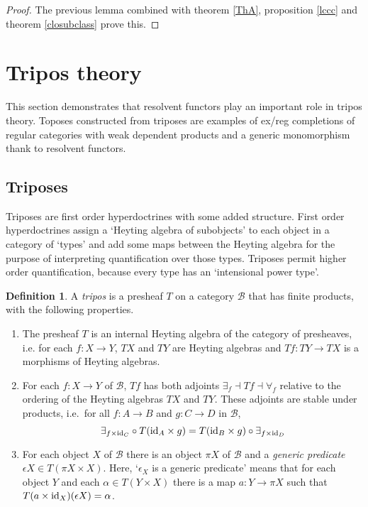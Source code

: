\documentclass[sort&compress]{elsarticle}
\theoremstyle{plain}
\theoremstyle{definition}
\newtheorem{defin}[theorem]{Definition}
\theoremstyle{remark}
\newcommand\hide[1]{}
\newcommand\cat\mathcal
\newcommand\exreg{_\mathrm{ex/reg}}
\begin{document}
\begin{proof} The previous lemma combined with theorem \ref{ThA}, proposition \ref{lccc} and theorem \ref{closubclass} prove this. \end{proof}

\hide{Menni's vraag over $\cat L$ is hiermee ook beantwoord: als $\cat L$ een topos is, dan is hij $\cat C\exreg$, en daar volgt verder alles uit. }

\section{Tripos theory}
This section demonstrates that resolvent functors play an important role in tripos theory. Toposes constructed from triposes are examples of ex/reg completions of regular categories with weak dependent products and a generic monomorphism thank to resolvent functors.

\subsection{Triposes}\label{TriThe}
Triposes are first order hyperdoctrines with some added structure. First order hyperdoctrines assign a `Heyting algebra of subobjects' to each object in a category of `types' and add some maps between the Heyting algebra for the purpose of interpreting quantification over those types. Triposes permit higher order quantification, because every type has an `intensional power type'.

\begin{defin} A \emph{tripos} is a presheaf $T$ on a category $\cat B$ that has finite products, with the following properties.
\begin{enumerate}
\item The presheaf $T$ is an internal Heyting algebra of the category of presheaves, i.e. for each $f:X\to Y$, $TX$ and $TY$ are Heyting algebras and $Tf:TY\to TX$ is a morphisms of Heyting algebras.
\item For each $f:X\to Y$ of $\cat B$, $Tf$ has both adjoints $\exists_f\dashv Tf \dashv \forall_f$ relative to the ordering of the Heyting algebras $TX$ and $TY$. 
These adjoints are stable under products, i.e.\ for all $f:A\to B$ and $g:C\to D$ in $\cat B$, 
\[ \exists_{f\times \mathrm{id}_C}\circ T(\mathrm{id}_A\times g) = T(\mathrm{id}_B\times g)\circ \exists_{f\times \mathrm{id}_D} \]
\item For each object $X$ of $\cat B$ there is an object $\pi X$ of $\cat B$ and a \emph{generic predicate} $\epsilon X\in T(\pi X\times X)$. Here, `$\epsilon_X$ is a generic predicate' means that for each object $Y$ and each $\alpha\in T(Y\times X)$ there is a map $a:Y\to \pi X$ such that $T(a\times \mathrm{id}_X)(\epsilon X) = \alpha$.
\end{enumerate}
\end{defin}
\end{document}
